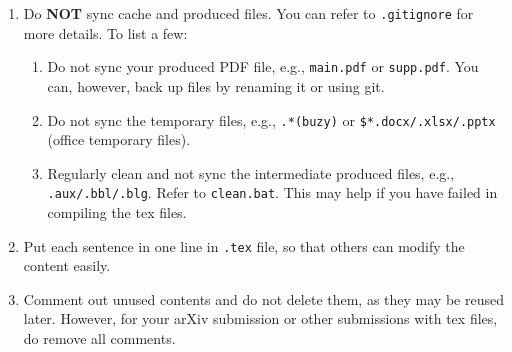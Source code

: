 \begin{enumerate}
  \item Do \textbf{NOT} sync cache and produced files. You can refer to \texttt{.gitignore} for more details. To list a few:
  \begin{enumerate}
    \item 
      Do not sync your produced PDF file, e.g., \texttt{main.pdf} or \texttt{supp.pdf}. 
      You can, however, back up files by renaming it or using git.
    \item Do not sync the temporary files, e.g., \texttt{.*(buzy)} or \texttt{\texttildelow\$*.docx/.xlsx/.pptx} (office temporary files).
    \item
      Regularly clean and not sync the intermediate produced files, e.g., \texttt{.aux/.bbl/.blg}. 
      Refer to \texttt{clean.bat}.
      This may help if you have failed in compiling the tex files.
  \end{enumerate}
  \item Put each sentence in one line in \texttt{.tex} file, so that others can modify the content easily.
  \item 
    Comment out unused contents and do not delete them, as they may be reused later.
    However, for your arXiv submission or other submissions with tex files, do remove all comments.
\end{enumerate}
